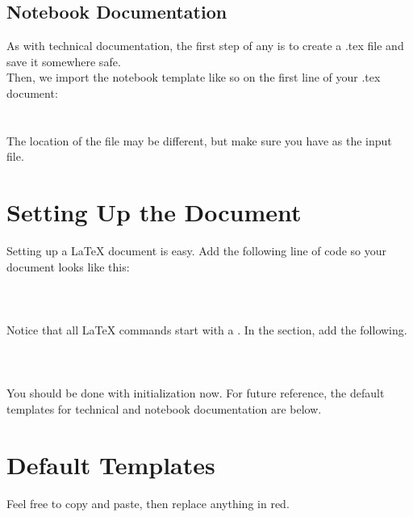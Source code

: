 \subsection{Notebook Documentation}
As with technical documentation, the first step of any is to create a .tex file and save it somewhere safe.\\
Then, we import the notebook template like so on the first line of your .tex document:\\\\ \\ The location of the file may be different, but make sure you have  as the input file.

\section{Setting Up the Document}
Setting up a \LaTeX{} document is easy.  Add the following line of code so your document looks like this: \\\\\\\\  Notice that all \LaTeX{} commands start with a \code{\sla}.\newpage
In the  section, add the following.
\\\\\\\\
You should be done with initialization now.  For future reference, the default templates for technical and notebook documentation are below.

\section{Default Templates}
Feel free to copy and paste, then replace anything in red.
